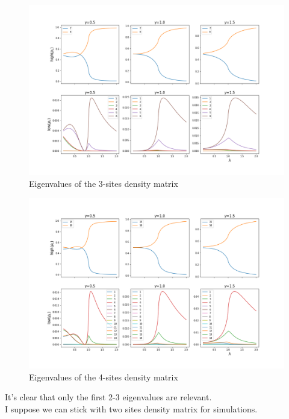 \documentclass[12pt,a4paper]{book}
\theoremstyle{definition}
\begin{document}
\begin{figure}[h]
	\centering
	\includegraphics[width=\linewidth]{graphs/3sites_3gammas}
	\caption{Eigenvalues of the 3-sites density matrix}
	\label{fig:3sites3gammas}
\end{figure}

\begin{figure}[h]
	\centering
	\includegraphics[width=\linewidth]{graphs/4sites_3gammas}
	\caption{Eigenvalues of the 4-sites density matrix}
	\label{fig:4sites3gammas}
\end{figure}
It's clear that only the first 2-3 eigenvalues are relevant. \\
I suppose we can stick with two sites density matrix for simulations.\\
\end{document}
